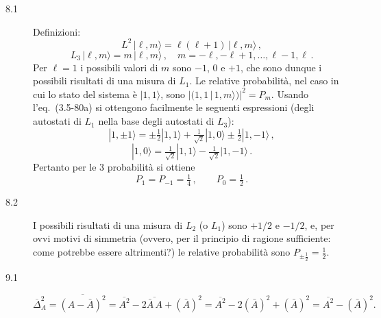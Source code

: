 \documentclass[11pt, a4paper]{book}
\numberwithin{equation}{section}
\begin{document}
\begin{description}
\item[8.1] Definizioni:
\[
  L^2\,|\ell,m\rangle = \ell(\ell+1)\,|\ell,m\rangle\,,
\]
\[
  L_3\,|\ell,m\rangle = m\,|\ell,m\rangle\,,\quad m=-\ell,-\ell+1,\ldots,\ell-1,\ell\,.
\]
Per $\ell=1$ i possibili valori di $m$ sono $-1$, $0$ e $+1$, che sono dunque i possibili risultati di una misura di $L_1$. Le relative probabilità, nel caso in cui lo stato del sistema è $|1,1\rangle$, sono $|(1,1\,|\,1,m\rangle)|^2 = P_m$. Usando l'eq.\ (3.5-80a) si ottengono facilmente le seguenti espressioni (degli autostati di $L_1$ nella base degli autostati di $L_3$):
\[
  |1,\pm1\rangle = \pm\tfrac{1}{2}|1,1\rangle + \tfrac{1}{\sqrt{2}}|1,0\rangle \pm \tfrac{1}{2}|1,-1\rangle\,,
\]
\[
  |1,0\rangle = \tfrac{1}{\sqrt{2}}|1,1\rangle - \tfrac{1}{\sqrt{2}}|1,-1\rangle\,.
\]
Pertanto per le 3 probabilità si ottiene
\[
  P_1 = P_{-1} = \tfrac{1}{4}\,,\qquad P_0 = \tfrac{1}{2}\,.
\]

\item[8.2] I possibili risultati di una misura di $L_2$ (o $L_1$) sono $+1/2$ e $-1/2$, e, per ovvi motivi di simmetria (ovvero, per il principio di ragione sufficiente: come potrebbe essere altrimenti?) le relative probabilità sono $P_{\pm\frac{1}{2}} = \tfrac{1}{2}$.

\item[9.1]
\[
  \overline{\Delta}_A^2 = \overline{(A-\bar{A})^2}
  = \overline{A^2} - 2\overline{\bar{A}\,A} + (\bar{A})^2
  = \overline{A^2} - 2(\bar{A})^2 + (\bar{A})^2
  = \overline{A^2} - (\bar{A})^2.
\]


\end{description}
\end{document}
